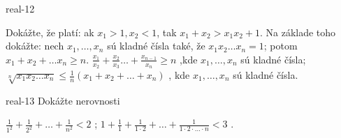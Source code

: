 \begin{defproblem}{real-12}
\begin{tasks}
  \task Dokážte, že platí: ak $x_1 > 1, x_2 < 1$, tak $x_1 + x_2 > x_1 x_2 + 1$.
  \task Na základe toho dokážte: nech $x_1, \ldots, x_n$ sú kladné čísla také,
        že $x_1 x_2 \ldots x_n = 1$; potom $x_1 + x_2 + \ldots x_n \geq n$.
  \task
    $\frac{x_1}{x_2} + \frac{x_2}{x_3} \ldots + \frac{x_{n-1}}{x_n} \geq n$
    ,kde $x_1, \ldots, x_n$ sú kladné čísla;
  \task
    $\sqrt[n]{x_1 x_2 \ldots x_n} \leq \frac{1}{n}(x_1 + x_2 + \ldots + x_n)$
    , kde $x_1, \ldots, x_n$ sú kladné čísla.
\end{tasks}
\end{defproblem}

\begin{defproblem}{real-13}
Dokážte nerovnosti
\begin{tasks}
  \task $\frac{1}{1^2} + \frac{1}{2^2} + \ldots + \frac{1}{n^2} < 2$ ;
  \task $1 + \frac{1}{1} + \frac{1}{1 \cdot 2} + \ldots +
         \frac{1}{1 \cdot 2 \cdot \ldots \cdot n} < 3$ .
\end{tasks}
\end{defproblem}
